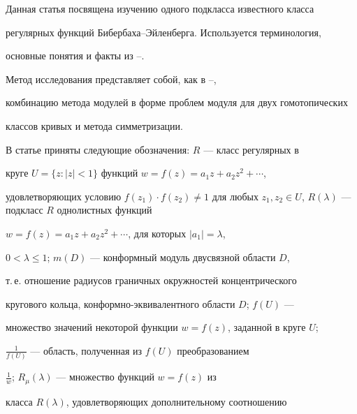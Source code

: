 \pagestyle{plain} %


 




\maketitle 


\label{begin} 


 


Данная статья посвящена изучению одного подкласса известного класса 


регулярных функций Бибербаха--Эйленберга. Используется терминология, 


основные понятия и факты из \cite{1}--\cite{3}.


Метод исследования представляет собой, как в \cite{3}--\cite{5},


комбинацию метода модулей в форме проблем модуля для двух гомотопических


классов кривых и метода симметризации.


 


В статье приняты следующие обозначения: $R$ --- класс регулярных в 


круге $U=\{z:|z|<1\}$ функций $w=f(z)=a_1z+a_2z^2+\dotsb$, 


удовлетворяющих условию $f(z_1)\cdot f(z_2)\ne1$ для любых $z_1,z_2\in 


U$, $R(\lambda)$ --- подкласс $R$ однолистных функций 


$w=f(z)=a_1z+a_2z^2+\dotsb$, для которых $|a_1|=\lambda$, 


$0<\lambda\le1$; $m(D)$ --- конформный модуль двусвязной области $D$, 


т.\,е. отношение радиусов граничных окружностей концентрического 


кругового кольца, конформно-эквивалентного области $D$; $f(U)$ --- 


множество значений некоторой функции $w=f(z)$, заданной в круге $U$; 


$\frac{1}{f(U)}$ --- область, полученная из $f(U)$ преобразованием 


$\frac{1}{w}$; $R_\mu(\lambda)$ --- множество функций $w=f(z)$ из 


класса $R(\lambda)$, удовлетворяющих дополнительному соотношению 


